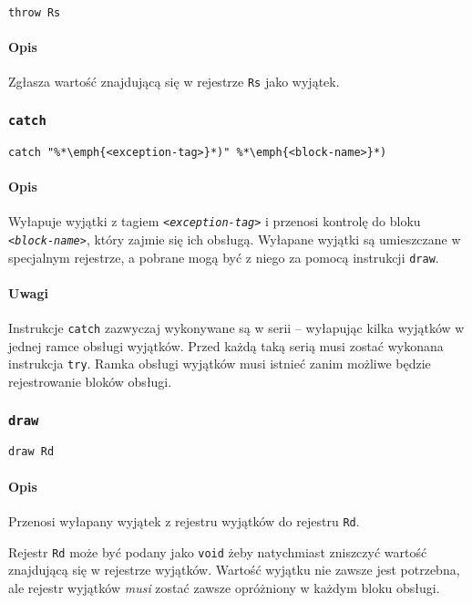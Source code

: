 \begin{lstlisting}
throw Rs
\end{lstlisting}

\paragraph*{Opis} Zgłasza wartość znajdującą się w rejestrze \texttt{Rs} jako
wyjątek.

\subsubsection{\texttt{catch}}

\begin{lstlisting}
catch "%*\emph{<exception-tag>}*)" %*\emph{<block-name>}*)
\end{lstlisting}

\paragraph*{Opis} Wyłapuje wyjątki z tagiem \texttt{\emph{<exception-tag>}} i
przenosi kontrolę do bloku \texttt{\emph{<block-name>}}, który zajmie się ich
obsługą. Wyłapane wyjątki są umieszczane w specjalnym rejestrze, a pobrane mogą
być z niego za pomocą instrukcji \texttt{draw}.

\paragraph*{Uwagi} Instrukcje \texttt{catch} zazwyczaj wykonywane są w serii --
wyłapując kilka wyjątków w jednej ramce obsługi wyjątków. Przed każdą taką serią
musi zostać wykonana instrukcja \texttt{try}. Ramka obsługi wyjątków musi
istnieć zanim możliwe będzie rejestrowanie bloków obsługi.

\subsubsection{\texttt{draw}}

\begin{lstlisting}
draw Rd
\end{lstlisting}

\paragraph*{Opis} Przenosi wyłapany wyjątek z rejestru wyjątków do rejestru
\texttt{Rd}.

Rejestr \texttt{Rd} może być podany jako \texttt{void} żeby natychmiast
zniszczyć wartość znajdującą się w rejestrze wyjątków. Wartość wyjątku nie
zawsze jest potrzebna, ale rejestr wyjątków \emph{musi} zostać zawsze opróżniony
w każdym bloku obsługi.


